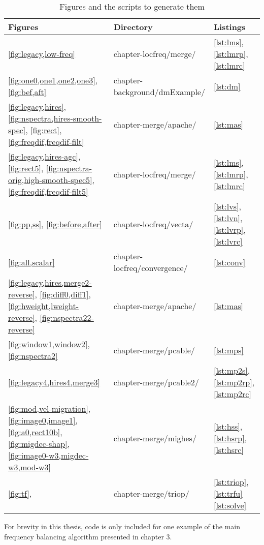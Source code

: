 \begin{table}[h]
\centering
\caption{Figures and the scripts to generate them}
\label{my-label}
\begin{tabular}{l|l|l}
\hline
        \textbf{Figures} & \textbf{Directory} & \textbf{Listings} \\ \hline 
        \ref{fig:legacy,low-freq} & chapter-locfreq/merge/ & \ref{lst:lms}, \ref{lst:lmrp}, \ref{lst:lmrc}\\ 
        \ref{fig:one0,one1,one2,one3}, \ref{fig:bef,aft} & chapter-background/dmExample/ & \ref{lst:dm} \\ 
        \ref{fig:legacy,hires}, \ref{fig:nspectra,hires-smooth-spec}, \ref{fig:rect}, \ref{fig:freqdif,freqdif-filt}           & chapter-merge/apache/ & \ref{lst:mas} \\ 
        \ref{fig:legacy,hires-agc}, \ref{fig:rect5}, \ref{fig:nspectra-orig,high-smooth-spec5}, \ref{fig:freqdif,freqdif-filt5}          & chapter-locfreq/merge/ &   \ref{lst:lms}, \ref{lst:lmrp}, \ref{lst:lmrc}\\ 
        \ref{fig:pp,ss}, \ref{fig:before,after}         & chapter-locfreq/vecta/&  \ref{lst:lvs}, \ref{lst:lvn}, \ref{lst:lvrp}, \ref{lst:lvrc}\\ 
        \ref{fig:all,scalar} & chapter-locfreq/convergence/&  \ref{lst:conv}\\ 
        \ref{fig:legacy,hires,merge2-reverse}, \ref{fig:diff0,diff1}, \ref{fig:hweight,lweight-reverse}, \ref{fig:nspectra22-reverse}           & chapter-merge/apache/ & \ref{lst:mas} \\ 
        \ref{fig:window1,window2}, \ref{fig:nspectra2} & chapter-merge/pcable/ & \ref{lst:mps} \\ 
        \ref{fig:legacy4,hires4,merge3}  & chapter-merge/pcable2/ & \ref{lst:mp2s}, \ref{lst:mp2rp}, \ref{lst:mp2rc}\\ 
        \ref{fig:mod,vel-migration}, \ref{fig:image0,image1}, \ref{fig:a0,rect10b}, \ref{fig:migdec-shap}, \ref{fig:image0-w3,migdec-w3,mod-w3} & chapter-merge/mighes/ & \ref{lst:hss}, \ref{lst:hsrp}, \ref{lst:hsrc}\\ 
        \ref{fig:tf}, & chapter-merge/triop/ & \ref{lst:triop}, \ref{lst:trfu} \ref{lst:solve}\\ 
\end{tabular}
\end{table}
For brevity in this thesis, code is only included for one example of the main frequency balancing algorithm presented in chapter 3.

